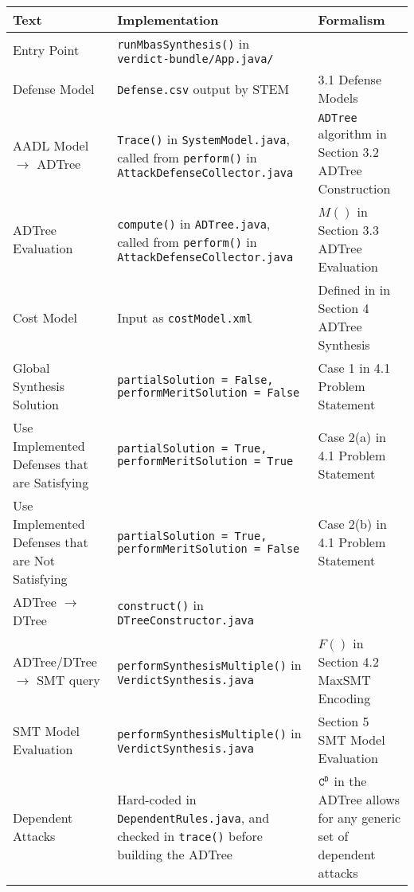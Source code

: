 \documentclass{article}
\begin{document}
	\begin{center}
		\begin{tabular}{| p{3cm} | p{5cm} | p{5cm} |}
		\hline
		\textbf{Text} & 
		\textbf{Implementation} &
		\textbf{Formalism}\\
		\hline
		Entry Point & 
		\texttt{runMbasSynthesis()} in
		\texttt{verdict-bundle/App.java/} & \\
		\hline
		Defense Model & 
		\texttt{Defense.csv} output by STEM & 
		3.1 Defense Models \\
		\hline
		AADL Model $\to$ ADTree & 
		\texttt{Trace()} in 
		\texttt{SystemModel.java}, called 
		from \texttt{perform()} in
		\texttt{AttackDefenseCollector.java} &
		\texttt{ADTree} algorithm in
		Section 3.2 ADTree Construction \\
		\hline
		ADTree Evaluation & 
		\texttt{compute()} in 
		\texttt{ADTree.java}, called 
		from \texttt{perform()} in
		\texttt{AttackDefenseCollector.java} & 
		$M()$ in Section 3.3
		ADTree Evaluation\\
		\hline 
		Cost Model & 
		Input as \texttt{costModel.xml} & 
		Defined in in Section 4 ADTree
		Synthesis \\
		\hline
		Global Synthesis Solution & 
		\texttt{partialSolution = False, 
			performMeritSolution = False} & 
		Case 1 in 4.1 Problem Statement \\
		\hline
		Use Implemented Defenses that are 
		Satisfying & 
		\texttt{partialSolution = True, 
			performMeritSolution = True} &
		Case 2(a) in 4.1 Problem Statement \\
		\hline
		Use Implemented Defenses that are 
		Not Satisfying & 
		\texttt{partialSolution = True, 
			performMeritSolution = False} &
		Case 2(b) in 4.1 Problem Statement \\
		\hline
		ADTree $\to$ DTree & 
		\texttt{construct()} in 
		\texttt{DTreeConstructor.java} & \\ 
		\hline
		ADTree/DTree $\to$ SMT query & 
		\texttt{performSynthesisMultiple()} in
		\texttt{VerdictSynthesis.java} &
		$F()$ in Section 4.2 MaxSMT Encoding \\
		\hline
		SMT Model Evaluation & 
		\texttt{performSynthesisMultiple()} in
		\texttt{VerdictSynthesis.java} & 
		Section 5 SMT Model Evaluation \\
		\hline
		Dependent Attacks & 
		Hard-coded in 
		\texttt{DependentRules.java}, 
		and checked in \texttt{trace()}
		before building the ADTree & 
		$\texttt{C}^\texttt{D}$ in the ADTree allows for any 
		generic set of dependent attacks \\
		\hline
		\end{tabular}
	\end{center}
\end{document}

